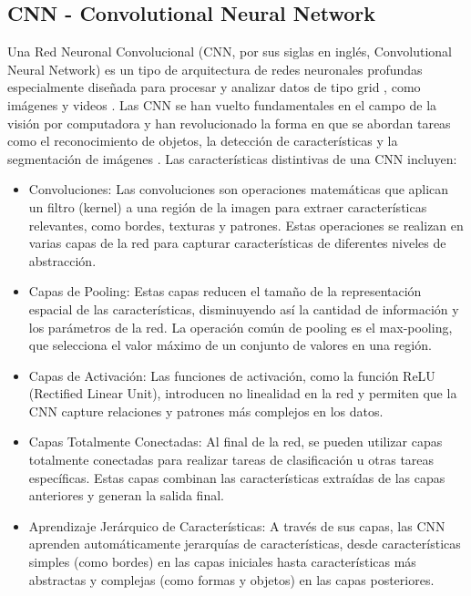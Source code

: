\documentclass[12pt,twoside,titlepage]{ingenius}
\begin{document}
\begin{multicols}{2}
\subsection{CNN - Convolutional Neural Network} 
Una Red Neuronal Convolucional (CNN, por sus siglas en inglés, Convolutional Neural Network) es un tipo de arquitectura de redes neuronales profundas especialmente diseñada para procesar y analizar datos de tipo grid , como imágenes y videos \cite{8}.  Las CNN se han vuelto fundamentales en el campo de la visión por computadora y han revolucionado la forma en que se abordan tareas como el reconocimiento de objetos, la detección de características y la segmentación de imágenes \cite{9}.
Las características distintivas de una CNN incluyen:
\begin{itemize}
	\item Convoluciones: Las convoluciones son operaciones matemáticas que aplican un filtro (kernel) a una región de la imagen para extraer características relevantes, como bordes, texturas y patrones. Estas operaciones se realizan en varias capas de la red para capturar características de diferentes niveles de abstracción.
	\item Capas de Pooling: Estas capas reducen el tamaño de la representación espacial de las características, disminuyendo así la cantidad de información y los parámetros de la red. La operación común de pooling es el max-pooling, que selecciona el valor máximo de un conjunto de valores en una región.
	\item Capas de Activación: Las funciones de activación, como la función ReLU (Rectified Linear Unit), introducen no linealidad en la red y permiten que la CNN capture relaciones y patrones más complejos en los datos.
	\item Capas Totalmente Conectadas: Al final de la red, se pueden utilizar capas totalmente conectadas para realizar tareas de clasificación u otras tareas específicas. Estas capas combinan las características extraídas de las capas anteriores y generan la salida final.
	\item Aprendizaje Jerárquico de Características: A través de sus capas, las CNN aprenden automáticamente jerarquías de características, desde características simples (como bordes) en las capas iniciales hasta características más abstractas y complejas (como formas y objetos) en las capas posteriores.
\end{itemize}


\end{multicols}
\end{document}
